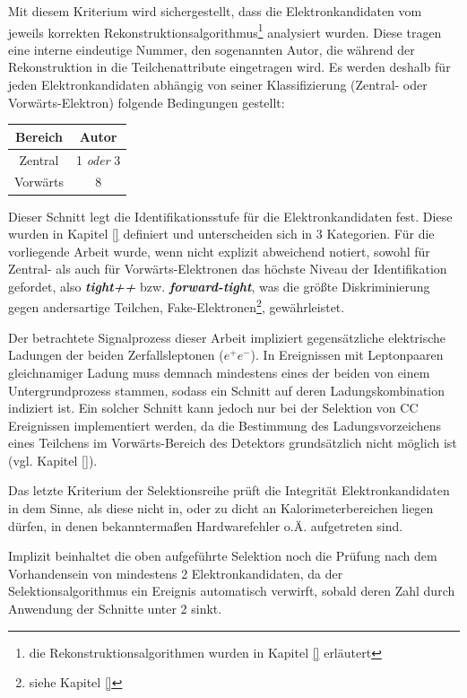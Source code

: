 \begin{description}
        Mit diesem Kriterium wird sichergestellt, dass die Elektronkandidaten
        vom jeweils korrekten Rekonstruktionsalgorithmus\footnote{die
        Rekonstruktionsalgorithmen wurden in Kapitel \ref{}
        erläutert} analysiert wurden. Diese tragen eine interne eindeutige
        Nummer, den sogenannten Autor, die während der Rekonstruktion in die
        Teilchenattribute eingetragen wird. Es werden deshalb für jeden
        Elektronkandidaten abhängig von seiner Klassifizierung (Zentral- oder
        Vorwärts-Elektron) folgende Bedingungen gestellt:
        \begin{table}[h!]
            \centering
            \begin{tabular}{|c|c|}
                \hline
                \bf{Bereich} & \bf{Autor} \\
                \hline \hline
                Zentral  & 1 \textit{oder} 3 \\
                Vorwärts & 8                 \\
                \hline
            \end{tabular}
        \end{table}

        Dieser Schnitt legt die Identifikationsstufe für die Elektronkandidaten
        fest. Diese wurden in Kapitel \ref{} definiert und unterscheiden sich
        in 3 Kategorien. Für die vorliegende Arbeit wurde, wenn nicht explizit
        abweichend notiert, sowohl für Zentral- als auch für
        Vorwärts-Elektronen das höchste Niveau der Identifikation gefordet,
        also \textbf{\textit{tight++}} bzw. \textbf{\textit{forward-tight}},
        was die größte Diskriminierung gegen andersartige Teilchen,
        Fake-Elektronen\footnote{siehe Kapitel \ref{}}, gewährleistet.

        Der betrachtete Signalprozess dieser Arbeit impliziert gegensätzliche
        elektrische Ladungen der beiden Zerfallsleptonen ($e^+e^-$). In
        Ereignissen mit Leptonpaaren gleichnamiger Ladung muss demnach
        mindestens eines der beiden von einem Untergrundprozess stammen, sodass
        ein Schnitt auf deren Ladungskombination indiziert ist. Ein solcher
        Schnitt kann jedoch nur bei der Selektion von \ac{CC} Ereignissen
        implementiert werden, da die Bestimmung des Ladungsvorzeichens eines
        Teilchens im Vorwärts-Bereich des Detektors grundsätzlich  nicht
        möglich ist (vgl. Kapitel \ref{}).

        Das letzte Kriterium der Selektionsreihe prüft die Integrität
        Elektronkandidaten in dem Sinne, als diese nicht in, oder zu dicht an
        Kalorimeterbereichen liegen dürfen, in denen bekanntermaßen
        Hardwarefehler o.Ä. aufgetreten sind.
\end{description}
Implizit beinhaltet die oben aufgeführte Selektion noch die Prüfung nach dem
Vorhandensein von mindestens 2 Elektronkandidaten, da der Selektionsalgorithmus
ein Ereignis automatisch verwirft, sobald deren Zahl durch Anwendung der
Schnitte unter 2 sinkt.

